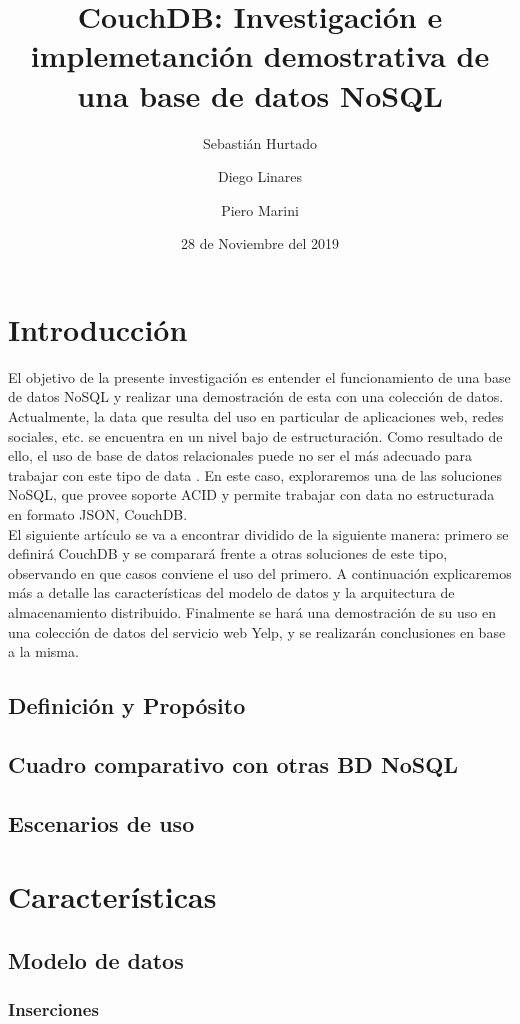 \documentclass{article}
\title{CouchDB: Investigación e implemetanción demostrativa de una base de datos NoSQL}
\author{Sebastián Hurtado \and Diego Linares \and Piero Marini}
\date{28 de Noviembre del 2019}
\begin{document}
    \maketitle  
    \section{Introducción}
        El objetivo de la presente investigación es entender el funcionamiento de una base de datos NoSQL y realizar una demostración de esta con una colección de datos. Actualmente, la data que resulta del uso en particular de aplicaciones web, redes sociales, etc. se encuentra en un nivel bajo de estructuración. Como resultado de ello, el uso de base de datos relacionales puede no ser el más adecuado para trabajar con este tipo de data \cite{sangeeta}. En este caso, exploraremos una de las soluciones NoSQL, que provee soporte ACID y permite trabajar con data no estructurada en formato JSON, CouchDB. \\
        El siguiente artículo se va a encontrar dividido de la siguiente manera: primero se definirá CouchDB y se comparará frente a otras soluciones de este tipo, observando en que casos conviene el uso del primero. A continuación explicaremos más a detalle las características del modelo de datos y la arquitectura de almacenamiento distribuido. Finalmente se hará una demostración de su uso en una colección de datos del servicio web Yelp, y se realizarán conclusiones en base a la misma. 
        \subsection{Definición y Propósito}

        \subsection{Cuadro comparativo con otras BD NoSQL}
        \subsection{Escenarios de uso}
    \section{Características}
        \subsection{Modelo de datos}
            \subsubsection{Inserciones}
\end{document}
